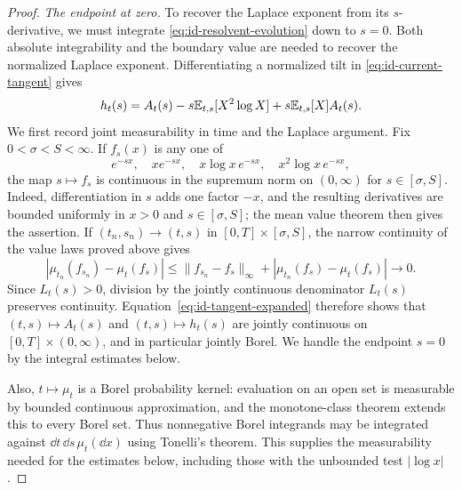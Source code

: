 \begin{proof}
\medskip\noindent\emph{The endpoint at zero.}
To recover the Laplace exponent from its $s$-derivative, we must integrate \eqref{eq:id-resolvent-evolution} down to $s=0$.
Both absolute integrability and the boundary value are needed to recover the normalized Laplace exponent.
Differentiating a normalized tilt in \eqref{eq:id-current-tangent} gives
\begin{equation}
 h_t(s)=A_t(s)-s\mathbb E_{t,s}[X^2\log X]
                  +s\mathbb E_{t,s}[X]A_t(s).
 \label{eq:id-tangent-expanded}
\end{equation}
We first record joint measurability in time and the Laplace argument.
Fix $0<\sigma<S<\infty$.
If $f_s(x)$ is any one of
\[
 e^{-sx},\quad xe^{-sx},\quad
             x\log x\,e^{-sx},\quad x^2\log x\,e^{-sx},
\]
the map $s\mapsto f_s$ is continuous in the supremum norm on $(0,\infty)$ for $s\in[\sigma,S]$.
Indeed, differentiation in $s$ adds one factor $-x$, and the resulting derivatives are bounded uniformly in $x>0$ and $s\in[\sigma,S]$; the mean value theorem then gives the assertion.
If $(t_n,s_n)\to(t,s)$ in $[0,T]\times[\sigma,S]$, the narrow continuity of the value laws proved above gives
\[
 |\mu_{t_n}(f_{s_n})-\mu_t(f_s)|
 \le\|f_{s_n}-f_s\|_\infty
       +|\mu_{t_n}(f_s)-\mu_t(f_s)|\longrightarrow0.
\]
Since $L_t(s)>0$, division by the jointly continuous denominator $L_t(s)$ preserves continuity.
Equation~\eqref{eq:id-tangent-expanded} therefore shows that $(t,s)\mapsto A_t(s)$ and $(t,s)\mapsto h_t(s)$ are jointly continuous on $[0,T]\times(0,\infty)$, and in particular jointly Borel.
We handle the endpoint $s=0$ by the integral estimates below.

Also, $t\mapsto\mu_t$ is a Borel probability kernel: evaluation on an open set is measurable by bounded continuous approximation, and the monotone-class theorem extends this to every Borel set.
Thus nonnegative Borel integrands may be integrated against $\dd t\,\dd s\,\mu_t(\dd x)$ using Tonelli's theorem.
This supplies the measurability needed for the estimates below, including those with the unbounded test $|\log x|$.


\end{proof}
